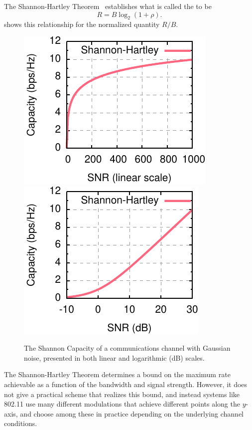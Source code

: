 The Shannon-Hartley Theorem~\cite{Shannon_capacity} establishes what is called the  to be
\begin{equation}
\label{eq:shannon_capacity}
R = B\log_2(1+\rho).
\end{equation}
 shows this relationship for the normalized quantity $R/B$.

\begin{figure}[tb]
\centering
\includegraphics{calculations/shannon}\hspace{0.65in}\includegraphics{calculations/shannon_log}\hspace{0.1in}
\caption[The Shannon Capacity of a communications channel with Gaussian noise]{\label{fig:shannon}The Shannon Capacity of a communications channel with Gaussian noise, presented in both linear and logarithmic (dB) scales.}
\end{figure}

The Shannon-Hartley Theorem determines a bound on the maximum rate achievable as a function of the bandwidth and signal strength. However, it does not give a practical scheme that realizes this bound, and instead systems like 802.11 use many different modulations that achieve different points along the $y$-axis, and choose among these in practice depending on the underlying channel conditions.

